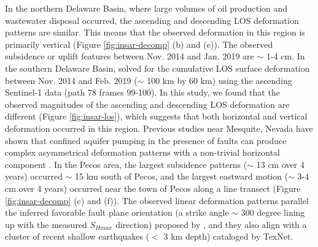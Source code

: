 \documentclass{utexasthesis}
\begin{document}
In the northern Delaware Basin, where large volumes of oil production and wastewater disposal occurred, the ascending and descending LOS deformation patterns are similar. This means that the observed deformation in this region is primarily vertical (Figure \ref{fig:insar-decomp} (b) and (e)). The observed subsidence or uplift features between Nov. 2014 and Jan. 2019 are $\sim$ 1-4 cm. In the southern Delaware Basin, \cite{Deng2020SurfaceDeformationInduced} solved for the cumulative LOS surface deformation between Nov. 2014 and Feb. 2019 ($\sim$ 100 km by 60 km) using the ascending Sentinel-1 data (path 78 frames 99-100). In this study, we found that the observed magnitudes of the ascending and descending LOS deformation are different (Figure \ref{fig:insar-los}), which suggests that both horizontal and vertical deformation occurred in this region. Previous studies near Mesquite, Nevada have shown that confined aquifer pumping in the presence of faults can produce complex asymmetrical deformation patterns with a non-trivial horizontal component \cite{burbey2008influence}. In the Pecos area, the largest subsidence patterns ($\sim$ 13 cm over 4 years) occurred $\sim$ 15 km south of Pecos, and the largest eastward motion ($\sim$ 3-4 cm over 4 years) occurred near the town of Pecos along a line transect (Figure \ref{fig:insar-decomp} (c) and (f)). The observed linear deformation patterns parallel the inferred favorable fault plane orientation (a strike angle $\sim$ 300 degree lining up with the measured $S_{Hmax}$ direction) proposed by \cite{LundSnee2018StateStressPermian}, and they also align with a cluster of recent shallow earthquakes ($<$ 3 km depth) cataloged by TexNet.
\end{document}

